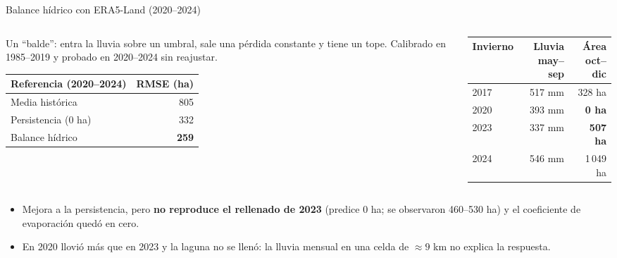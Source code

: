 \documentclass[10pt]{beamer}
\newcommand{\dato}[1]{\textbf{\color{blue!60!black}#1}}
\begin{document}
\begin{frame}{Balance hídrico con ERA5-Land (2020--2024)}
\begin{columns}[T]
\begin{column}{0.48\textwidth}
\small
Un ``balde'': entra la lluvia sobre un umbral, sale una pérdida constante y tiene un tope. Calibrado en 1985--2019 y probado en 2020--2024 sin reajustar.
\vspace{2mm}

\centering
\begin{tabular}{lr}
\toprule
Referencia (2020--2024) & RMSE (ha) \\
\midrule
Media histórica & 805 \\
Persistencia (0 ha) & 332 \\
Balance hídrico & \dato{259} \\
\bottomrule
\end{tabular}
\end{column}
\begin{column}{0.5\textwidth}
\small
\centering
\begin{tabular}{lrr}
\toprule
Invierno & Lluvia may--sep & Área oct--dic \\
\midrule
2017 & 517 mm & 328 ha \\
2020 & 393 mm & \dato{0 ha} \\
2023 & 337 mm & \dato{507 ha} \\
2024 & 546 mm & 1\,049 ha \\
\bottomrule
\end{tabular}
\end{column}
\end{columns}
\vspace{3mm}
\begin{itemize}
\item Mejora a la persistencia, pero \textbf{no reproduce el rellenado de 2023} (predice 0 ha; se observaron 460--530 ha) y el coeficiente de evaporación quedó en cero.
\item En 2020 llovió más que en 2023 y la laguna no se llenó: la lluvia mensual en una celda de ${\approx}9$ km no explica la respuesta.
\end{itemize}
\end{frame}
\end{document}
